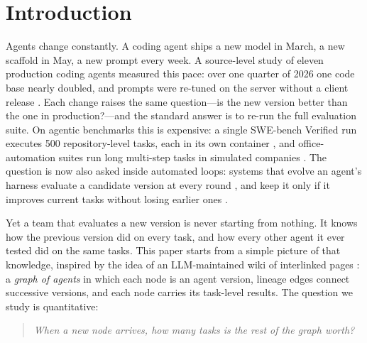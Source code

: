 \documentclass[11pt]{article}
\begin{document}
\section{Introduction}
Agents change constantly. A coding agent ships a new model in March, a new scaffold in May, a new prompt every
week. A source-level study of eleven production coding agents measured this pace: over one quarter of 2026 one
code base nearly doubled, and prompts were re-tuned on the server without a client release
\citep{barbaste2026harness}. Each change raises the same question---is the new version better than the one in production?---and the
standard answer is to re-run the full evaluation suite. On agentic benchmarks this is expensive: a single
SWE-bench Verified run executes 500 repository-level tasks, each in its own container
\citep{jimenez2024swebench}, and office-automation suites run long multi-step tasks in simulated companies
\citep{xu2024theagentcompany}. The question is now also asked inside automated loops: systems that evolve an
agent's harness evaluate a candidate version at every round \citep{wang2026harnessevo}, and keep it only if it improves
current tasks without losing earlier ones \citep{kang2026hcl}.

Yet a team that evaluates a new version is never starting from nothing. It knows how the previous version did on
every task, and how every other agent it ever tested did on the same tasks. This paper starts from a simple
picture of that knowledge, inspired by the idea of an LLM-maintained wiki of interlinked pages
\citep{karpathy2026wiki}: a \emph{graph of agents} in which each node is an agent version, lineage edges connect
successive versions, and each node carries its task-level results. The question we study is quantitative:

\begin{quote}\emph{When a new node arrives, how many tasks is the rest of the graph worth?}\end{quote}
\end{document}
